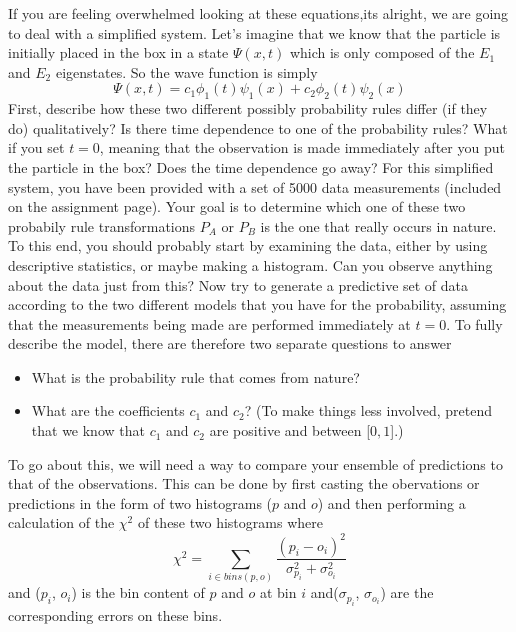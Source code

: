 \documentclass[12pt]{article}
\begin{document}
If you are feeling overwhelmed looking at these equations,its alright, we are going to deal with a simplified system.  Let's imagine that we know that the particle is initially placed in the box in a state $\Psi(x,t)$ which is only composed of the $E_1$ and $E_2$ eigenstates.  So the wave function is simply 
\begin{displaymath}
\Psi(x,t)=c_{1}\phi_{1}(t)\psi_{1}(x)+c_{2}\phi_{2}(t)\psi_{2}(x)
\end{displaymath}
First, describe how these two different possibly probability rules differ (if they do) qualitatively?  Is there time dependence to one of the probability rules?  What if you set $t=$0, meaning that the observation is made immediately after you put the particle in the box?  Does the time dependence go away?
\newline
\newline
For this simplified system, you have been provided with a set of 5000 data measurements (included on the assignment page).  Your goal is to determine which one of these two probabily rule transformations $P_{A}$ or $P_{B}$ is the one that really occurs in nature.  To this end, you should probably start by examining the data, either by using descriptive statistics, or maybe making a histogram.  Can you observe anything about the data just from this?  Now try to generate a predictive set of data according to the two different models that you have for the probability, assuming that the measurements being made are performed immediately at $t=$0.  To fully describe the model, there are therefore two separate questions to answer
\begin{itemize}[noitemsep]
\item What is the probability rule that comes from nature?
\item What are the coefficients $c_1$ and $c_2$? (To make things less involved, pretend that we know that $c_1$ and $c_2$ are positive and between [$0,1$].)
\end{itemize}
To go about this, we will need a way to compare your ensemble of predictions to that of the observations.  This can be done by first casting the obervations or predictions in the form of two histograms ($p$ and $o$) and then performing a calculation of the $\chi^{2}$ of these two histograms where
\begin{displaymath}
\chi^{2}=\displaystyle\sum_{i \in bins(p,o)} \frac{(p_{i}-o_{i})^2}{\sigma_{p_{i}}^{2}+\sigma_{o_{i}}^{2}}
\end{displaymath}
and ($p_{i}$, $o_{i}$) is the bin content of $p$ and $o$ at bin $i$ and($\sigma_{p_{i}}$, $\sigma_{o_{i}}$) are the corresponding errors on these bins.
\end{document}
